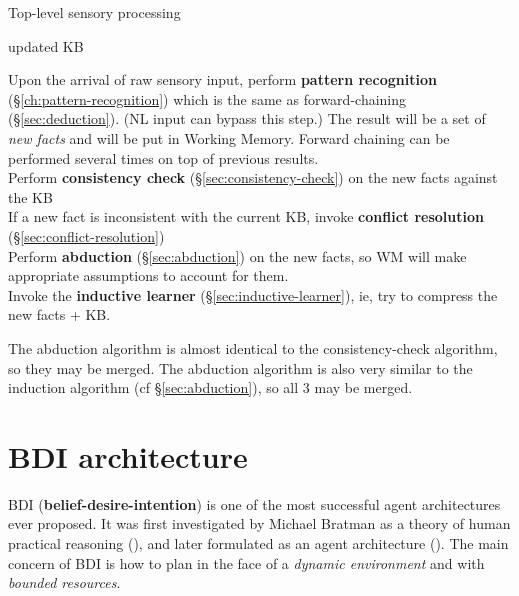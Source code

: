 \begin{algorithm}[H]
\caption{Top-level sensory processing}
{updated KB}
\begin{algtab}

Upon the arrival of raw sensory input, perform \textbf{pattern recognition} (\S\ref{ch:pattern-recognition}) which is the same as forward-chaining (\S\ref{sec:deduction}).  (NL input can bypass this step.)  The result will be a set of \textit{new facts} and will be put in Working Memory.  Forward chaining can be performed several times on top of previous results.\\

Perform \textbf{consistency check} (\S\ref{sec:consistency-check}) on the new facts against the KB\\

If a new fact is inconsistent with the current KB, invoke \textbf{conflict resolution} (\S\ref{sec:conflict-resolution})\\

Perform \textbf{abduction} (\S\ref{sec:abduction}) on the new facts, so WM will make appropriate assumptions to account for them.\\

Invoke the \textbf{inductive learner} (\S\ref{sec:inductive-learner}), ie, try to compress the new facts + KB.\\
\end{algtab}
\end{algorithm}
\vspace{-0.6cm}

The abduction algorithm is almost identical to the consistency-check algorithm, so they may be merged.  The abduction algorithm is also very similar to the induction algorithm (cf \S\ref{sec:abduction}), so all 3 may be merged.

\section{BDI architecture}

BDI (\textbf{belief-desire-intention}) is one of the most successful agent architectures ever proposed.  It was first investigated by Michael Bratman as a theory of human practical reasoning (\citep*{Bratman1987}), and later formulated as an agent architecture (\citep*{Bratman1988}).  The main concern of BDI is how to plan in the face of a \textit{dynamic environment} and with \textit{bounded resources}.

